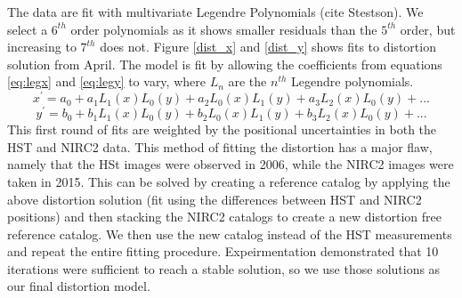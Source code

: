 The data are fit with multivariate Legendre Polynomials (cite Stestson).  We select a $6^{th}$ order polynomials as it shows smaller residuals than the $5^{th}$ order, but increasing to $7^{th}$ does not.  Figure \ref{dist_x} and \ref{dist_y} shows fits to distortion solution from April.  The model is fit by allowing the coefficients from equations \ref{eq:legx} and \ref{eq:legy} to vary, where $L_{n}$ are the $n^{th}$ Legendre polynomials.  
\begin{equation}
x^{'} = a_{0} + a_{1}L_{1}(x)L_{0}(y) +  a_{2}L_{0}(x)L_{1}(y) + a_{3}L_{2}(x)L_{0}(y)+...
\label{eq:legx}
\end{equation}
\begin{equation}
y^{'} = b_{0} + b_{1}L_{1}(x)L_{0}(y) +  b_{2}L_{0}(x)L_{1}(y) + b_{3}L_{2}(x)L_{0}(y)+...
\label{eq:legy}
\end{equation}
This first round of fits are weighted by the positional uncertainties in both the HST and NIRC2 data.  This method of fitting the distortion has a major flaw, namely that the HSt images were observed in 2006, while the NIRC2 images were taken in 2015.   This can be solved by creating a reference catalog by applying the above distortion solution (fit using the differences between HST and NIRC2 positions) and then stacking the NIRC2 catalogs to create a new distortion free reference catalog.  We then use the new catalog instead of the HST measurements and repeat the entire fitting procedure.  Expeirmentation demonstrated that 10 iterations were sufficient to reach a stable solution, so we use those solutions as our final distortion model.  



